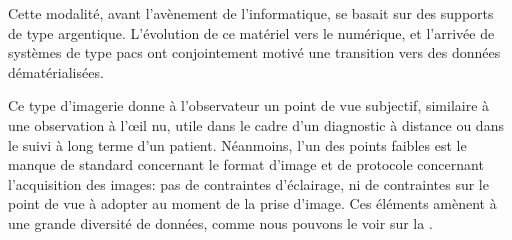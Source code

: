 Cette modalité, avant l’avènement de l’informatique, se basait sur des supports de type argentique. L’évolution de ce matériel vers le numérique, et l’arrivée de systèmes de type \gls{pacs} ont conjointement motivé une transition vers des données dématérialisées.\par

Ce type d’imagerie donne à l’observateur un point de vue subjectif, similaire à une observation à l’œil nu, utile dans le cadre d’un diagnostic à distance ou dans le suivi à long terme d’un patient. Néanmoins, l'un des points faibles est le manque de standard concernant le format d'image et de protocole concernant l'acquisition des images: pas de contraintes d'éclairage, ni de contraintes sur le point de vue à adopter au moment de la prise d'image. Ces éléments amènent à une grande diversité de données, comme nous pouvons le voir sur la .\par

